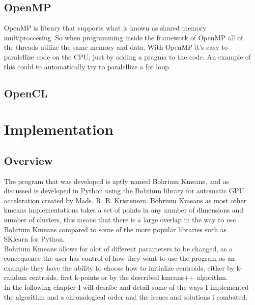 \documentclass[12pt]{report}
\begin{document}
\section{OpenMP}
\label{subsec:openmp}
OpenMP is  library that supports what is known as shared memory multiproccesing. So when programming inside the framework of OpenMP all of the threads utilize the same memory and data. With OpenMP it's easy to paralellize code on the CPU, just by adding a pragma to the code. An example of this could to automatically try to paralellize a for loop.




\section{OpenCL}
\label{subsec:opencl}




\chapter{Implementation}
\label{subsec:implement}
\section{Overview}
\label{subsec:overview}
The program that was developed is aptly named Bohrium Kmeans, and as discussed is developed in Python using the Bohrium library for automatic GPU acceleration created by Mads. R. B. Kristensen. Bohrium Kmeans as most other kmeans implementations takes a set of points in any number of dimensions and number of clusters, this means that there is a large overlap in the way to use Bohrium Kmeans compared to some of the more popular libraries such as SKlearn for Python.\\
Bohrium Kmeans allows for alot of different parameters to be changed, as a concequence the user has control of how they want to use the program as an example they have the ability to choose how to initialize centroids, either by k-random centroids, first k-points or by the described kmeans++ algorithm.\\
In the following chapter I will desribe and detail some of the ways I implemented the algorithm and a chronological order and the issues and solutions i combated.
\end{document}
